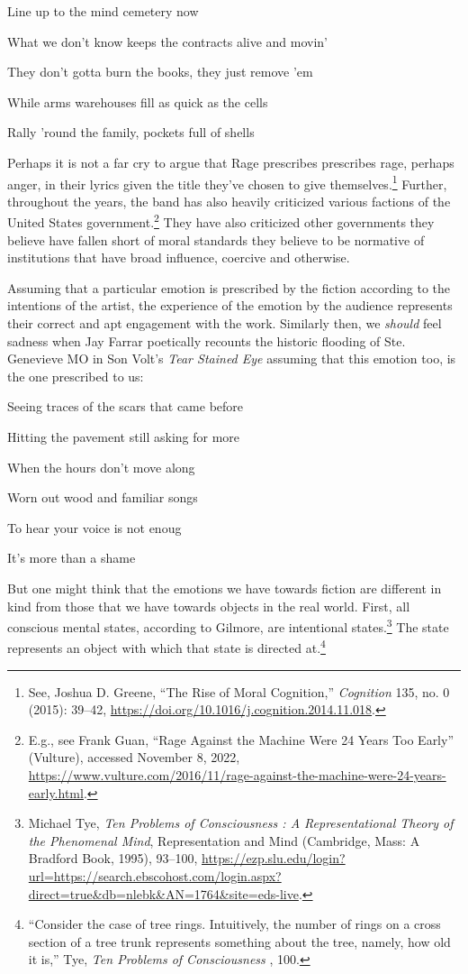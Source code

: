 \documentclass[phdthesis,12pt,final]{wuthesis}
\theoremstyle{definition}
\theoremstyle{definition}
\theoremstyle{definition}
\theoremstyle{definition}
\theoremstyle{remark}
\begin{document}
Line up to the mind cemetery now

What we don't know keeps the contracts alive and movin'

They don't gotta burn the books, they just remove 'em

While arms warehouses fill as quick as the cells

Rally 'round the family, pockets full of shells

\noindent Perhaps it is not a far cry to argue that Rage prescribes prescribes rage, perhaps anger, in their lyrics given the title they've chosen to give themselves.\footnote{See, Joshua D. Greene, {``The Rise of Moral Cognition,''} \emph{Cognition} 135, no. 0 (2015): 39--42, \url{https://doi.org/10.1016/j.cognition.2014.11.018}.} Further, throughout the years, the band has also heavily criticized various factions of the United States government.\footnote{E.g., see Frank Guan, {``Rage Against the Machine Were 24 Years Too Early''} (Vulture), accessed November 8, 2022, \url{https://www.vulture.com/2016/11/rage-against-the-machine-were-24-years-early.html}.} They have also criticized other governments they believe have fallen short of moral standards they believe to be normative of institutions that have broad influence, coercive and otherwise.

Assuming that a particular emotion is prescribed by the fiction according to the intentions of the artist, the experience of the emotion by the audience represents their correct and apt engagement with the work. Similarly then, we \emph{should} feel sadness when Jay Farrar poetically recounts the historic flooding of Ste. Genevieve MO in Son Volt's \emph{Tear Stained Eye} assuming that this emotion too, is the one prescribed to us:

Seeing traces of the scars that came before

Hitting the pavement still asking for more

When the hours don't move along

Worn out wood and familiar songs

To hear your voice is not enoug

It's more than a shame

But one might think that the emotions we have towards fiction are different in kind from those that we have towards objects in the real world. First, all conscious mental states, according to Gilmore, are intentional states.\footnote{Michael Tye, \emph{Ten {Problems} of {Consciousness} : {A Representational Theory} of the {Phenomenal Mind}}, Representation and {Mind} (Cambridge, Mass: A Bradford Book, 1995), 93--100, \url{https://ezp.slu.edu/login?url=https://search.ebscohost.com/login.aspx?direct=true&db=nlebk&AN=1764&site=eds-live}.} The state represents an object with which that state is directed at.\footnote{``Consider the case of tree rings. Intuitively, the number of rings on a cross section of a tree trunk represents something about the tree, namely, how old it is,'' Tye, \emph{Ten {Problems} of {Consciousness} }, 100.}
\end{document}
